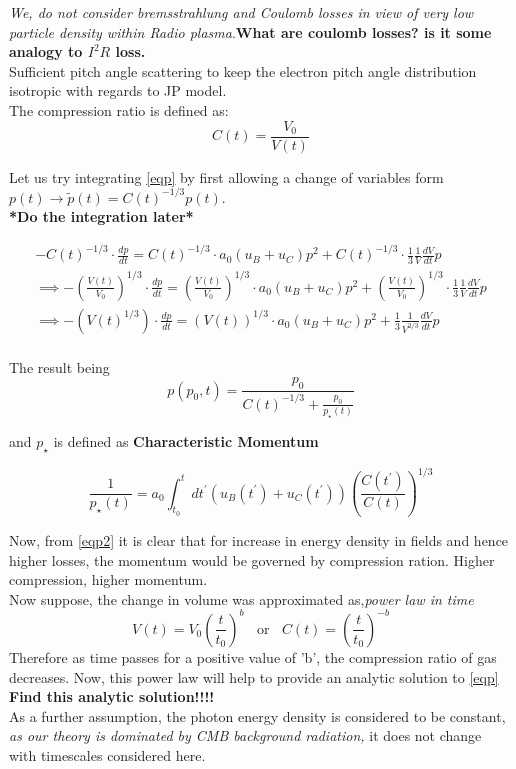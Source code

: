 \documentclass[12pt]{report}
\newcommand{\tbf}[1]{\textbf{#1}}
\newcommand{\tit}[1]{\textit{#1}}
\newcommand{\de}[2]{\frac{d{#1}}{d{#2}}}
\newcommand{\cc}[1]{\left({#1}\right)}
\begin{document}
\tit{We, do not consider bremsstrahlung and Coulomb losses in view of very low particle density within Radio plasma}.\tbf{What are coulomb losses? is it some analogy to $I^2R$ loss.}\\

Sufficient pitch angle scattering to keep the electron pitch angle distribution isotropic with regards to JP model.\\

The compression ratio is defined as:
\begin{equation}
C(t)=\frac{V_0}{V(t)}
\end{equation}

Let us try integrating \eqref{eqp} by first allowing a change of variables form $p(t)\rightarrow \tilde{p}(t)=C(t)^{-1/3}p(t)$.\\

\tbf{*Do the integration later*}

\begin{eqnarray*}
-C(t)^{-1/3} \cdot \de{p}{t}=C(t)^{-1/3} \cdot a_0(u_B+u_C)p^2 +C(t)^{-1/3} \cdot \frac{1}{3}\frac{1}{V}\de{V}{t}p\\
\implies -\cc{\frac{V(t)}{V_0}}^{1/3} \cdot \de{p}{t}=\cc{\frac{V(t)}{V_0}}^{1/3} \cdot a_0(u_B+u_C)p^2 + \cc{\frac{V(t)}{V_0}}^{1/3}\cdot \frac{1}{3}\frac{1}{V}\de{V}{t}p\\
\implies - \cc{V(t)^{1/3}} \cdot \de{p}{t}=\cc{V(t)}^{1/3} \cdot a_0(u_B+u_C)p^2 +  \frac{1}{3}\frac{1}{V^{2/3}}\de{V}{t}p\\
\end{eqnarray*}

The result being
\begin{equation}\label{eqp2}
p(p_0,t)=\frac{p_0}{C(t)^{-1/3}+\frac{p_0}{p_\star (t)}}
\end{equation}

and $p_\star$ is defined as \tbf{Characteristic Momentum}

\begin{equation}\label{eqpstar}
\frac{1}{p_\star(t)}=a_0\int^t _{t_0} dt^\prime \cc{u_B(t^\prime)+u_C(t^\prime)}\cc{\frac{C(t^\prime)}{C(t)}}^{1/3}
\end{equation}


Now, from \eqref{eqp2} it is clear that for increase in energy density in fields and hence higher losses, the momentum would be governed by compression ration. Higher compression, higher momentum.\\


Now suppose, the change in volume was approximated as,\tit{power law in time}
\begin{equation}
V(t)=V_0\cc{\frac{t}{t_0}}^{b}\;\;\text{ or }\;\;C(t)=\cc{\frac{t}{t_0}}^{-b}
\end{equation}
Therefore as time passes for a positive value of 'b', the compression ratio of gas decreases. Now, this power law will help to provide an analytic solution to \eqref{eqp} \tbf{Find this analytic solution!!!!}\\
As a further assumption, the photon energy density is considered to be constant, \tit{as our theory is dominated by CMB background radiation, } it does not change with timescales considered here.\\
\end{document}
